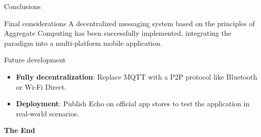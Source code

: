 \documentclass[aspectratio=169,xcolor=dvipsnames]{beamer}
\begin{document}
\begin{frame}{Conclusions}

    \begin{block}{Final considerations}
        A decentralized messaging system based on the principles of
        Aggregate Computing has been successfully implemented, integrating the paradigm into a multi-platform mobile application.

    \end{block}

    \vspace{0.2cm}

    \begin{block}{Future development}
        \begin{itemize}
            \item \textbf{Fully decentralization}: Replace MQTT with a P2P protocol like Bluetooth or Wi-Fi Direct.
            \item \textbf{Deployment}: Publish Echo on official app stores to test the application in real-world scenarios.
        \end{itemize}
    \end{block}
    
\end{frame}

\begin{frame}
    \Huge{\centerline{\textbf{The End}}}
\end{frame}

\end{document}
